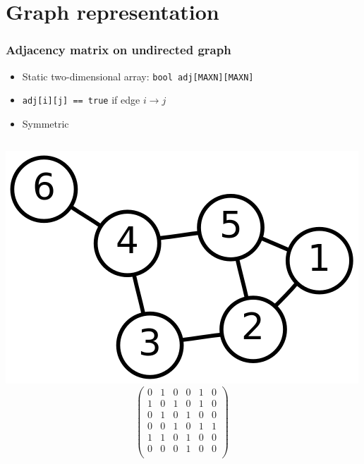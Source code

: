 \documentclass[12pt]{beamer}
\begin{document}
\section{Graph representation}

\begin{frame}
\frametitle{Adjacency matrix on undirected graph}
\begin{itemize}
\item Static two-dimensional array: \texttt{bool adj[MAXN][MAXN]}
\item \texttt{adj[i][j] == true} if edge $i \to j$
\item Symmetric
\end{itemize}
\begin{columns}
\flushright
\includegraphics[width=0.85\linewidth]{img/6n-graph}
\[\left(
\begin{array}{cccccc}
0&1&0&0&1&0\\
1&0&1&0&1&0\\
0&1&0&1&0&0\\
0&0&1&0&1&1\\
1&1&0&1&0&0\\
0&0&0&1&0&0\\
\end{array}
\right)\]
\end{columns}
\end{frame}
\end{document}
